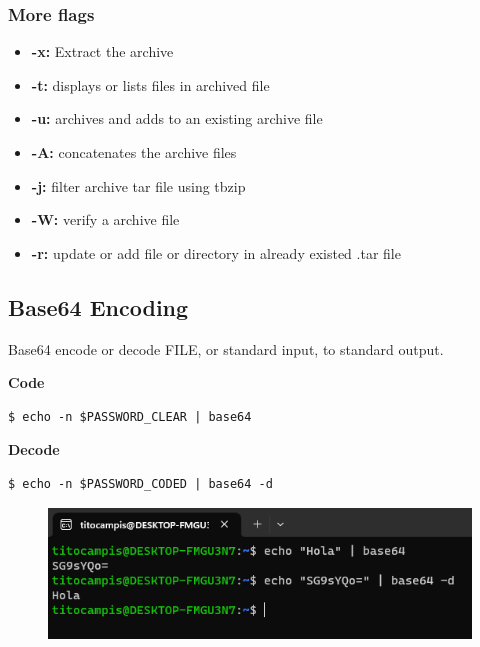 \documentclass{article}
\newenvironment{codetemplate}[1][]{%
  \mybasecolorbox[#1]
  \itshape
}{%
  \endmybasecolorbox
}
\begin{document}
\subsubsection{More flags}
\begin{itemize}
    \item \textbf{-x:} Extract the archive 
    \item \textbf{-t:} displays or lists files in archived file 
    \item \textbf{-u:} archives and adds to an existing archive file 
    \item \textbf{-A:} concatenates the archive files 
    \item \textbf{-j:} filter archive tar file using tbzip
    \item \textbf{-W:} verify a archive file
    \item \textbf{-r:} update or add file or directory in already existed .tar file
\end{itemize}

\subsection{Base64 Encoding}

Base64 encode or decode FILE, or standard input, to standard output.

\textbf{Code}
\begin{codetemplate}{}
\begin{verbatim}
$ echo -n $PASSWORD_CLEAR | base64
\end{verbatim}
\end{codetemplate}

\textbf{Decode}
\begin{codetemplate}{}
\begin{verbatim}
$ echo -n $PASSWORD_CODED | base64 -d
\end{verbatim}
\end{codetemplate}

\begin{figure}[H]
    \centering
    \includegraphics[width=\textwidth]{pictures/base64.png}
\end{figure}
\end{document}
